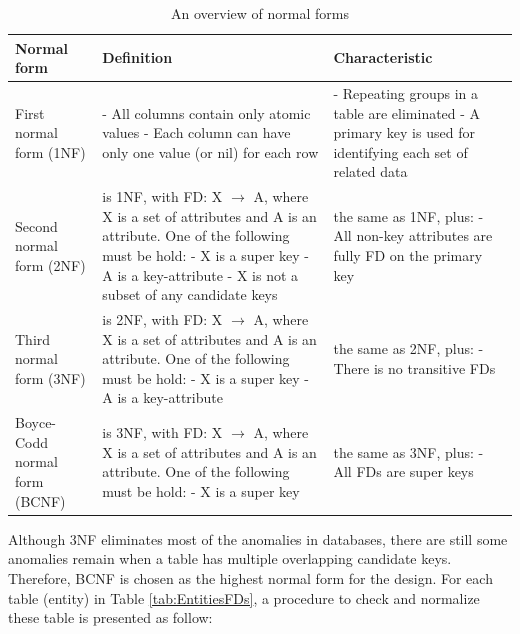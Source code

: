 \begin{table}[ht]
\begin{center}
\begin{tabular}{ |p{3cm}||p{5cm}|p{5cm}|  }
 \hline
 Normal form& Definition& Characteristic\\
 \hline
 First normal form (1NF)&- All columns contain only atomic values\newline
 - Each column can have only one value (or nil) for each row&- Repeating groups in a table are eliminated\newline
 - A primary key is used for identifying each set of related data\\
 \hline
 Second normal form (2NF)&is 1NF, with FD: X $\rightarrow$ A, where X is a set of attributes and A is an attribute. One of the following must be hold:\newline
 - X is a super key\newline
 - A is a key-attribute\newline
 - X is not a subset of any candidate keys&the same as 1NF, plus:\newline
 - All non-key attributes are fully FD on the primary key\\
 \hline
 Third normal form (3NF)&is 2NF, with FD: X $\rightarrow$ A, where X is a set of attributes and A is an attribute. One of the following must be hold:\newline
 - X is a super key\newline
 - A is a key-attribute&the same as 2NF, plus:\newline
 - There is no transitive FDs\\
 \hline
 Boyce-Codd normal form (BCNF)&is 3NF, with FD: X $\rightarrow$ A, where X is a set of attributes and A is an attribute. One of the following must be hold:\newline
 - X is a super key&the same as 3NF, plus:\newline
 - All FDs are super keys\\
 \hline
\end{tabular}
\end{center}
\caption{An overview of normal forms}
\label{tab:FamousNF}
\end{table}
Although 3NF eliminates most of the anomalies in databases, there are still some anomalies remain when a table has multiple overlapping candidate keys. Therefore, BCNF is chosen as the highest normal form for the design. For each table (entity) in Table \ref{tab:EntitiesFDs}, a procedure to check and normalize these table is presented as follow\cite{INF3100_Recipe_book}:
